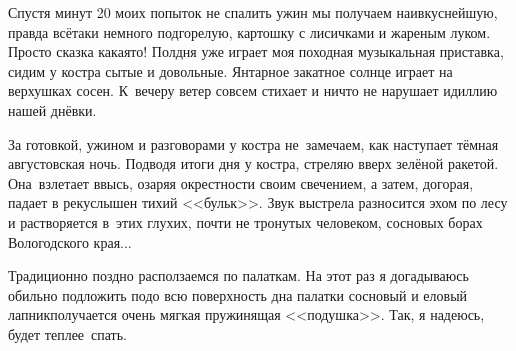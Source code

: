 Спустя минут 20 моих попыток не спалить ужин мы получаем наивкуснейшую, правда всё\sdash таки немного подгорелую, картошку с лисичками и жареным луком.  Просто сказка какая\sdash то! Полдня уже играет моя походная музыкальная приставка, сидим у костра сытые и довольные. Янтарное закатное солнце играет на верхушках сосен. К~вечеру ветер совсем стихает и ничто не нарушает идиллию нашей днёвки.

За готовкой, ужином и разговорами у костра не~замечаем, как наступает тёмная августовская ночь. Подводя итоги дня у костра, стреляю вверх зелёной ракетой. Она~взлетает ввысь, озаряя окрестности своим свечением, а затем, догорая, падает в реку\mdash слышен тихий <<бульк>>. Звук выстрела разносится эхом по лесу и растворяется в~этих глухих, почти не тронутых человеком, сосновых борах Вологодского края$\ldots$

Традиционно поздно расползаемся по палаткам. На этот раз я догадываюсь обильно подложить подо всю поверхность дна палатки сосновый и еловый лапник\mdash получается очень мягкая пружинящая <<подушка>>. Так, я надеюсь, будет теплее~спать. 

\begin{center}
\end{center}
